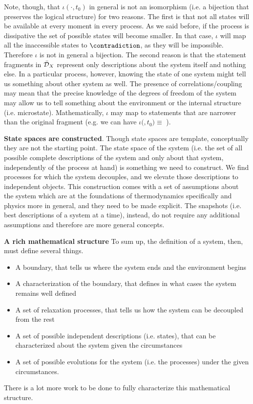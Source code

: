 \documentclass[10pt, onecolumn, longbibliography, nofootinbib]{revtex4-2}
\begin{document}
Note, though, that $\iota( \cdot, t_0)$ in general is not an isomorphism (i.e. a bijection that preserves the logical structure) for two reasons. The first is that not all states will be available at every moment in every process. As we said before, if the process is dissipative the set of possible states will become smaller. In that case, $\iota$ will map all the inaccessible states to $\contradiction$, as they will be impossible. Therefore $\iota$ is not in general a bijection. The second reason is that the statement fragments in $\bar{\mathcal{D}}_{X}$ represent only descriptions about the system itself and nothing else. In a particular process, however, knowing the state of one system might tell us something about other system as well. The presence of correlations/coupling may mean that the precise knowledge of the degrees of freedom of the system may allow us to tell something about the environment or the internal structure (i.e. microstate). Mathematically, $\iota$ may map to statements that are narrower than the original fragment (e.g. we can have $\iota($$, t_0) \equiv$ ).

\textbf{State spaces are constructed}. Though state spaces are template, conceptually they are not the starting point. The state space of the system (i.e. the set of all possible complete descriptions of the system and only about that system, independently of the process at hand) is something we need to construct. We find processes for which the system decouples, and we elevate those descriptions to independent objects. This construction comes with a set of assumptions about the system which are at the foundations of thermodynamics specifically and physics more in general, and they need to be made explicit. The snapshots (i.e. best descriptions of a system at a time), instead, do not require any additional assumptions and therefore are more general concepts.

\textbf{A rich mathematical structure} To sum up, the definition of a system, then, must define several things.
\begin{itemize}
	\item A boundary, that tells us where the system ends and the environment begins
	\item A characterization of the boundary, that defines in what cases the system remains well defined
	\item A set of relaxation processes, that tells us how the system can be decoupled from the rest
	\item A set of possible independent descriptions (i.e. states), that can be characterized about the system given the circumstances
	\item A set of possible evolutions for the system (i.e. the processes) under the given circumstances.
\end{itemize}
There is a lot more work to be done to fully characterize this mathematical structure.
\end{document}
